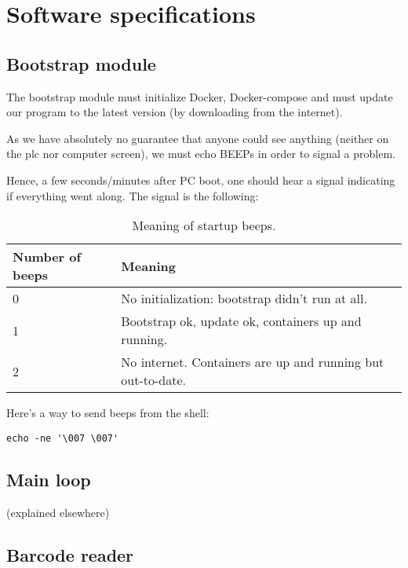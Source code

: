 \chapter{Software specifications}
\label{chapter:softwarereqs}

\section{Bootstrap module}

The bootstrap module must initialize Docker, Docker-compose and must update our program to the latest
version (by downloading from the internet).

As we have absolutely no guarantee that anyone could see anything (neither on the \gls{plc} nor computer screen),
we must echo BEEPs in order to signal a problem.

Hence, a few seconds/minutes after PC boot, one should hear a signal indicating if everything went along.
The signal is the following:

\begin{table}[ht]
	\centering
	\begin{tabular}{@{}ll@{}}
	\toprule
        Number of beeps &   Meaning \\ \midrule
        0               &   No initialization: bootstrap didn't run at all. \\
        1               &   Bootstrap ok, update ok, containers up and running. \\
        2               &   No internet. Containers are up and running but out-to-date. \\ \bottomrule
	\end{tabular}
	\caption{Meaning of startup beeps.}
	\label{table:beeps}
\end{table}

Here's a way to send beeps from the shell:

\begin{lstlisting}[style=Bash,caption={beep}]
echo -ne '\007 \007'
\end{lstlisting}

\section{Main loop}

(explained elsewhere)

\section{Barcode reader}

